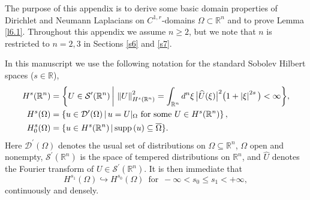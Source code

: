 \documentclass[reqno,10pt, centertags]{amsart}
\newcommand{\bbR}{{\mathbb{R}}}
\newcommand{\cD}{{\mathcal D}}
\newcommand{\cS}{{\mathcal S}}
\newcommand{\abs}[1]{\left\lvert#1\right\rvert}
\newcommand{\norm}[1]{\left\Vert#1\right\Vert}
\newcommand{\ol}{\overline}
\newcommand{\Om}{\Omega}
\newcommand{\supp}{\text{\rm{supp}}}
\newcommand{\hatt}{\widehat}
\numberwithin{equation}{section}
\theoremstyle{definition}
\begin{document}
The purpose of this appendix is to derive some basic domain properties of
Dirichlet and Neumann Laplacians on $C^{1,r}$-domains $\Om\subset\bbR^n$
and to prove Lemma \ref{l6.1}. Throughout this appendix we assume
$n\geq 2$, but we note that $n$ is restricted to $n=2,3$ in
Sections \ref{s6} and \ref{s7}.

In this manuscript we use the following notation for the standard
Sobolev Hilbert spaces ($s\in\bbR$),
\begin{align}
H^{s}(\bbR^n) &=\bigg\{U\in \cS^\prime (\bbR^n) \,\bigg|\,
\norm{U}_{H^{s}(\bbR^n)}^2 = \int_{\bbR^n} d^n \xi \, \big|\hatt
U(\xi)\big|^2\big(1+\abs{\xi}^{2s}\big) <\infty \bigg\},
\\
H^{s}(\Om) &=\left\{u\in \cD^\prime(\Om) \,|\, u=U|_\Om \text{
for some } U\in H^{s}(\bbR^n) \right\},
\\
H_0^{s}(\Om) &=\{u\in H^s(\bbR^n)\,|\, \supp\,(u)\subseteq\ol{\Om}\}.
\end{align}
Here $\cD^\prime(\Om)$ denotes the usual set of distributions on
$\Omega\subseteq \bbR^n$, $\Omega$ open and nonempty,
$\cS^\prime (\bbR^n)$ is the space of tempered distributions on
$\bbR^n$, and $\hatt U$ denotes the Fourier transform of $U\in
\cS^\prime (\bbR^n)$. It is then immediate that
\begin{equation}\label{incl-xxx}
H^{s_1}(\Omega)\hookrightarrow H^{s_0}(\Omega) \, \text{ for } \,
-\infty<s_0\leq s_1<+\infty,
\end{equation}
continuously and densely. 
\end{document}
